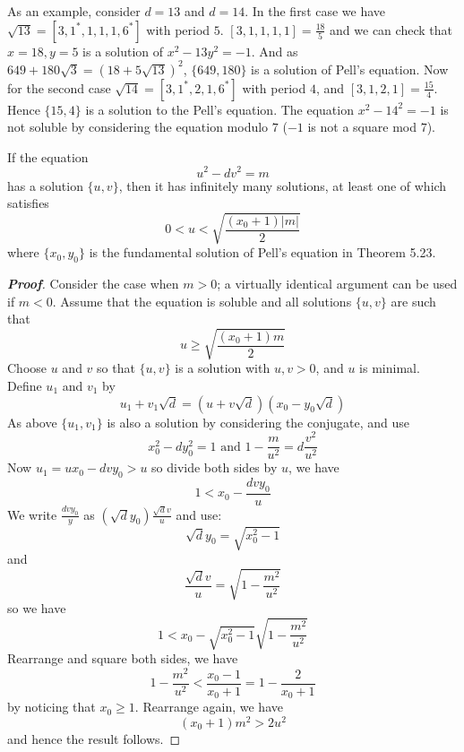 As an example, consider $d=13$ and $d=14$. In the first case we have $\sqrt{13}=[3,1^*,1,1,1,6^*]$ with period $5$.
$[3,1,1,1,1]=\frac{18}{5}$ and we can check that $x=18,y=5$ is a solution of
$x^2-13y^2=-1$. And as $649+180\sqrt{3}=(18+5\sqrt{13})^2$, $\{649,180\}$ is a solution
of Pell's equation. Now for the second case $\sqrt{14}=[3,1^*,2,1,6^*]$ with period $4$, and
$[3,1,2,1]=\frac{15}{4}$. Hence $\{15,4\}$ is a solution to the Pell's equation. The equation $x^2-14^2=-1$ is not soluble by considering the equation modulo
$7$ ($-1$ is not a square mod $7$).
\begin{theorem} If the equation $$u^2-dv^2=m$$ has a solution $\{u,v\}$, then it has
infinitely many solutions, at least one of which satisfies
$$0<u<\sqrt{\frac{(x_0+1)|m|}{2}}$$
where $\{x_0,y_0\}$ is the fundamental solution of Pell's equation in Theorem 5.23.
\end{theorem}
\begin{proof}[\bf Proof] Consider the case when $m>0$; a virtually identical argument can be used if $m<0$.
Assume that the equation is soluble and all solutions $\{u,v\}$ are such that
$$u \ge \sqrt{\frac{(x_0+1)m}{2}}$$
Choose $u$ and $v$ so that $\{u,v\}$ is a solution with $u,v>0$, and $u$ is minimal. Define
$u_1$ and $v_1$ by
$$u_1+v_1 \sqrt{d}=(u+v\sqrt{d})(x_0-y_0\sqrt{d})$$
As above $\{u_1,v_1\}$ is also a solution by considering the conjugate, and use
$$x^2_0-dy^2_0=1 \text{ and } 1-\frac{m}{u^2}=d\frac{v^2}{u^2}$$
Now $u_1=ux_0-dvy_0 >u$ so divide both sides by $u$, we have
$$1<x_0-\frac{dvy_0}{u}$$
We write $\frac{dvy_0}{y}$ as $(\sqrt{d}y_0) \frac{\sqrt{d} v}{u}$
and use:
$$\sqrt{d}y_0=\sqrt{x^2_0-1}$$
and
$$\frac{\sqrt{d}v}{u}=\sqrt{1-\frac{m^2}{u^2}}$$
so we have
$$1<x_0-\sqrt{x^2_0-1}\sqrt{1-\frac{m^2}{u^2}}$$
Rearrange and square both sides, we have
$$1-\frac{m^2}{u^2}<\frac{x_0-1}{x_0+1}=1-\frac{2}{x_0+1}$$ by noticing that $x_0 \ge 1$.
Rearrange again, we have
$$(x_0+1)m^2>2u^2$$ and hence the result follows.
\end{proof}


